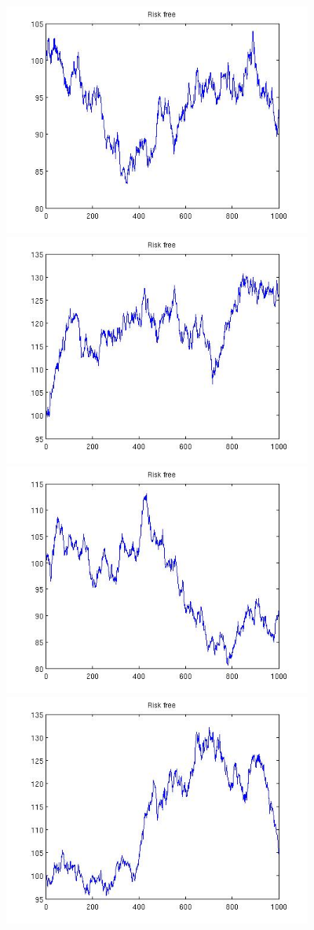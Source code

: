 \documentclass[12pt]{article}
\begin{document}
\begin{center}
    \includegraphics[width=4in]{riskfree5.jpg}
    \includegraphics[width=4in]{riskfree6.jpg}
    \includegraphics[width=4in]{riskfree7.jpg}
    \includegraphics[width=4in]{riskfree8.jpg}

\end{center}
\end{document}
